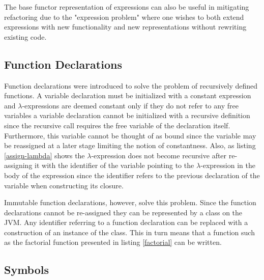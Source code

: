 The base functor representation of expressions can also be useful in mitigating refactoring due to the "expression problem" where one wishes
to both extend expressions with new functionality and new representations without rewriting existing code. \cite{swierstra2008data}


\subsection{Function Declarations}\label{sec:functions}

Function declarations were introduced to solve the problem of
recursively defined functions. A variable declaration must be initialized
with a constant expression and $\lambda$-expressions are deemed constant
only if they do not refer to any free variables a variable declaration cannot be initialized with a recursive definition since the recursive call
requires the free variable of the declaration itself. Furthermore, this
variable cannot be thought of as bound since the variable may be reassigned
at a later stage limiting the notion of constantness. Also, as listing \ref{assign-lambda} shows the $\lambda$-expression does not become recursive after re-assigning it with the identifier of the variable pointing to the $\lambda$-expression in the body of the expression since the identifier refers to the previous declaration of the variable when
constructing its closure.

Immutable function declarations, however, solve this problem. Since the
function declarations cannot be re-assigned they can be represented by
a class on the JVM. Any identifier referring to a function declaration can
be replaced with a construction of an instance of the class. This in turn means that a function such as the factorial function presented in listing \ref{factorial} can be written.

\subsection{Symbols}

